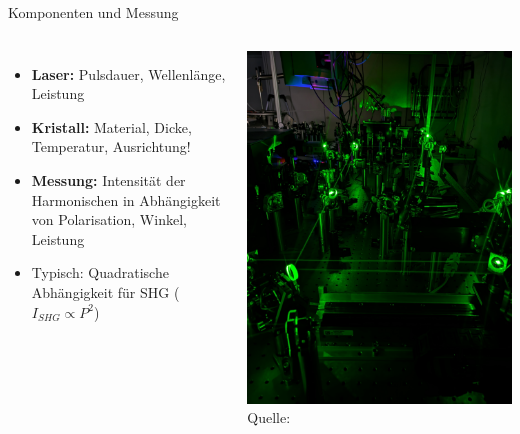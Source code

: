 \documentclass[aspectratio=169]{beamer} %
\newcommand{\figcite}[1]{\\[-3mm]{\tiny Quelle: \cite{#1}}}
\begin{document}
\begin{frame}{Komponenten und Messung}
  \begin{columns}[T,onlytextwidth]
      \begin{itemize}
        \item \textbf{Laser:} Pulsdauer, Wellenlänge, Leistung
        \item \textbf{Kristall:} Material, Dicke, Temperatur, Ausrichtung!
        \item \textbf{Messung:} Intensität der Harmonischen in Abhängigkeit von Polarisation, Winkel, Leistung
        \item Typisch: Quadratische Abhängigkeit für SHG ($I_{SHG} \propto P^2$)
      \end{itemize}
      \centering
      \includegraphics[height=0.8\textheight]{Images/PXL_20250318_131716572.NIGHT.jpg}
      {\figcite{Adamczyk2025}}
  \end{columns}

\end{frame}
\end{document}
